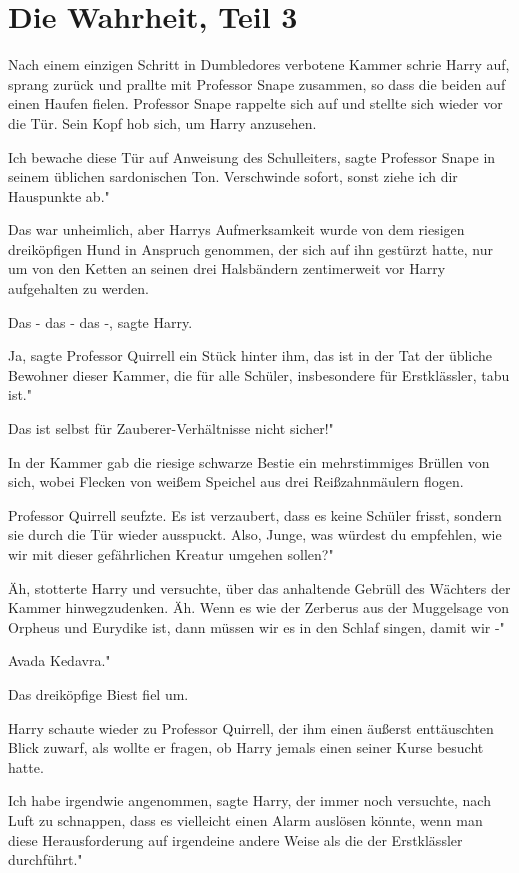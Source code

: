 \chapter{Die Wahrheit, Teil 3}

Nach einem einzigen Schritt in Dumbledores verbotene Kammer schrie Harry auf,
sprang zurück und prallte mit Professor Snape zusammen, so dass die beiden auf
einen Haufen fielen. Professor Snape rappelte sich auf und stellte sich wieder
vor die Tür. Sein Kopf hob sich, um Harry anzusehen.

\glqq Ich bewache diese Tür auf Anweisung des Schulleiters\grqq{}, sagte
Professor Snape in seinem üblichen sardonischen Ton. \glqq Verschwinde sofort,
sonst ziehe ich dir Hauspunkte ab."

Das war unheimlich, aber Harrys Aufmerksamkeit wurde von dem riesigen
dreiköpfigen Hund in Anspruch genommen, der sich auf ihn gestürzt hatte, nur um
von den Ketten an seinen drei Halsbändern zentimerweit vor Harry aufgehalten zu
werden.

\glqq Das - das - das -\grqq{}, sagte Harry.

\glqq Ja\grqq{}, sagte Professor Quirrell ein Stück hinter ihm, \glqq das ist in
der Tat der übliche Bewohner dieser Kammer, die für alle Schüler, insbesondere
für Erstklässler, tabu ist."

\glqq Das ist selbst für Zauberer-Verhältnisse nicht sicher!"

In der Kammer gab die riesige schwarze Bestie ein mehrstimmiges Brüllen von
sich, wobei Flecken von weißem Speichel aus drei Reißzahnmäulern flogen.

Professor Quirrell seufzte. \glqq Es ist verzaubert, dass es keine Schüler
frisst, sondern sie durch die Tür wieder ausspuckt. Also, Junge, was würdest du
empfehlen, wie wir mit dieser gefährlichen Kreatur umgehen sollen?"

\glqq Äh\grqq{}, stotterte Harry und versuchte, über das anhaltende Gebrüll des
Wächters der Kammer hinwegzudenken. \glqq Äh. Wenn es wie der Zerberus aus der
Muggelsage von Orpheus und Eurydike ist, dann müssen wir es in den Schlaf
singen, damit wir -"

\glqq Avada Kedavra."

Das dreiköpfige Biest fiel um.

Harry schaute wieder zu Professor Quirrell, der ihm einen äußerst enttäuschten
Blick zuwarf, als wollte er fragen, ob Harry jemals einen seiner Kurse besucht
hatte.

\glqq Ich habe irgendwie angenommen\grqq{}, sagte Harry, der immer noch
versuchte, nach Luft zu schnappen, \glqq dass es vielleicht einen Alarm auslösen
könnte, wenn man diese Herausforderung auf irgendeine andere Weise als die der
Erstklässler durchführt."

